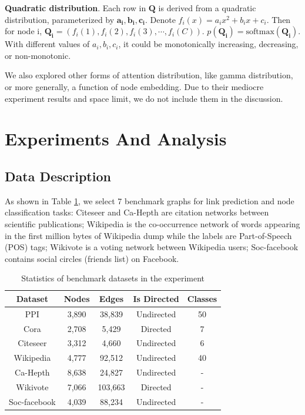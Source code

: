 \documentclass{article}
\begin{document}
\textbf{Quadratic distribution}.
Each row in $\mathbf{Q}$ is derived from a quadratic distribution, parameterized by $\mathbf{a_i, b_i, c_i}$. Denote $f_i(x) = a_ix^2+b_ix+c_i$. Then for node i, $\mathbf{Q_i} = (f_i(1), f_i(2), f_i(3), \cdots, f_i(C))$. $p(\mathbf{Q_i}) = \text{softmax}(\mathbf{Q_i})$. With different values of $a_i, b_i, c_i$, it could be monotonically increasing, decreasing, or non-monotonic.

We also explored other forms of attention distribution, like gamma distribution, or more generally, a function of node embedding. Due to their mediocre experiment results and space limit, we do not include them in the discussion.

\section{Experiments And Analysis}
\subsection{Data Description}
As shown in Table \ref{tab:datasets}, we select 7 benchmark graphs for link prediction and node classification tasks: Citeseer and Ca-Hepth are citation networks between scientific publications; Wikipedia is the co-occurrence network of words appearing in the first million bytes of Wikipedia dump while the labels are Part-of-Speech (POS) tags; Wikivote is a voting network between Wikipedia users; Soc-facebook contains social circles (friends list) on Facebook. 

\begin{table}[ht]
\caption{Statistics of benchmark datasets in the experiment}
\label{tab:datasets}
\centering
\begin{tabular}{c|c|c|c|c}
\toprule
Dataset & Nodes  & Edges & Is Directed & Classes\\
\midrule
PPI & 3,890  & 38,839 & Undirected & 50\\
Cora & 2,708  & 5,429 & Directed & 7\\
Citeseer & 3,312 & 4,660 & Undirected & 6\\
Wikipedia & 4,777 & 92,512 & Undirected & 40 \\
Ca-Hepth & 8,638 & 24,827 & Undirected & -\\
Wikivote & 7,066 & 103,663 & Directed & -\\
Soc-facebook & 4,039 & 88,234 & Undirected & -\\
\bottomrule
\end{tabular}
\end{table}
\end{document}
